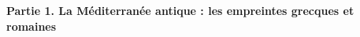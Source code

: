 \documentclass[xcolor=table,french,14pt]{beamer}
\begin{document}
\begin{frame}
\begin{center}  
{\Large \textbf{Partie 1. La Méditerranée antique : les empreintes grecques et romaines}\par}
\end{center}
\end{frame}
\end{document}
